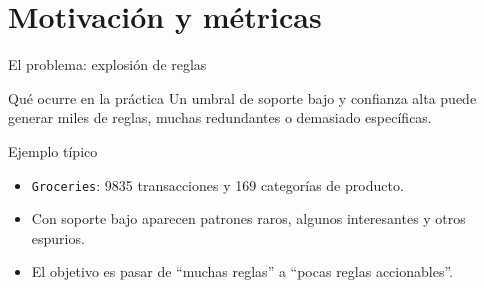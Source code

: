 \documentclass[10pt,aspectratio=169]{beamer}
\begin{document}
\section{Motivación y métricas}

\begin{frame}{El problema: explosión de reglas}
\begin{block}{Qué ocurre en la práctica}
Un umbral de soporte bajo y confianza alta puede generar miles de reglas, muchas redundantes o demasiado específicas.
\end{block}

\begin{exampleblock}{Ejemplo típico}
\begin{itemize}
  \item \texttt{Groceries}: 9835 transacciones y 169 categorías de producto.
  \item Con soporte bajo aparecen patrones raros, algunos interesantes y otros espurios.
  \item El objetivo es pasar de ``muchas reglas'' a ``pocas reglas accionables''.
\end{itemize}
\end{exampleblock}
\end{frame}
\end{document}
